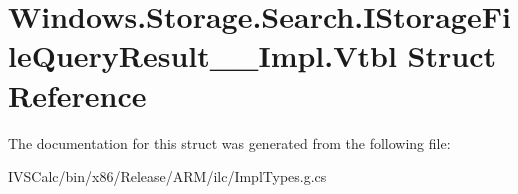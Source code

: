 \hypertarget{struct_windows_1_1_storage_1_1_search_1_1_i_storage_file_query_result_____impl_1_1_vtbl}{}\section{Windows.\+Storage.\+Search.\+I\+Storage\+File\+Query\+Result\+\_\+\+\_\+\+Impl.\+Vtbl Struct Reference}
\label{struct_windows_1_1_storage_1_1_search_1_1_i_storage_file_query_result_____impl_1_1_vtbl}


The documentation for this struct was generated from the following file\+:\begin{DoxyCompactItemize}
\item 
I\+V\+S\+Calc/bin/x86/\+Release/\+A\+R\+M/ilc/Impl\+Types.\+g.\+cs\end{DoxyCompactItemize}
